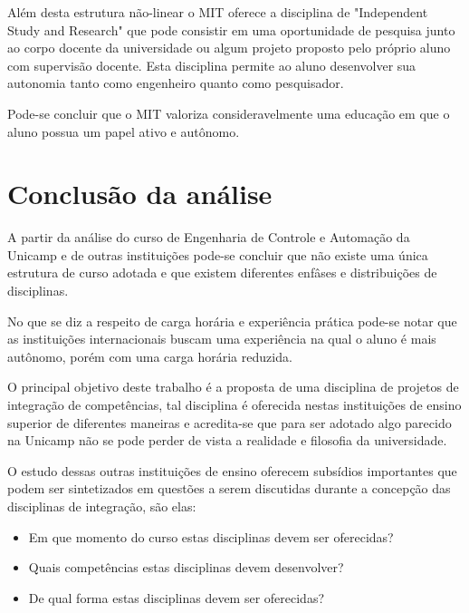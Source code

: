 \documentclass[12pt]{article} %
\begin{document}
Além desta estrutura não-linear o MIT oferece a disciplina de "Independent Study and Research" que pode consistir em uma oportunidade de pesquisa junto ao corpo docente da universidade ou algum projeto proposto pelo próprio aluno com supervisão docente. Esta disciplina permite ao aluno desenvolver sua autonomia tanto como engenheiro quanto como pesquisador.

Pode-se concluir que o MIT valoriza consideravelmente uma educação em que o aluno possua um papel ativo e autônomo.


\section{Conclusão da análise}

A partir da análise do curso de Engenharia de Controle e Automação da Unicamp e de outras instituições pode-se concluir que não existe uma única estrutura de curso adotada e que existem diferentes enfâses e distribuições de disciplinas.

No que se diz a respeito de carga horária e experiência prática pode-se notar que as instituições internacionais buscam uma experiência na qual o aluno é mais autônomo, porém com uma carga horária reduzida.

O principal objetivo deste trabalho é a proposta de uma disciplina de projetos de integração de competências, tal disciplina é oferecida nestas instituições de ensino superior de diferentes maneiras e acredita-se que para ser adotado algo parecido na Unicamp não se pode perder de vista a realidade e filosofia da universidade.

O estudo dessas outras instituições de ensino oferecem subsídios importantes que podem ser sintetizados em questões a serem discutidas durante a concepção das disciplinas de integração, são elas:

\begin{itemize}
\item Em que momento do curso estas disciplinas devem ser oferecidas?
\item Quais competências estas disciplinas devem desenvolver?
\item De qual forma estas disciplinas devem ser oferecidas?
\end{itemize}
\end{document}
